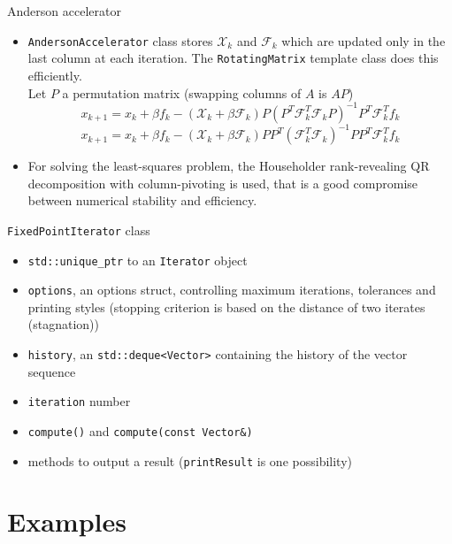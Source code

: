\documentclass{beamer}
\begin{document}
				\begin{frame}{Anderson accelerator}
				\begin{itemize}
				\item \texttt{AndersonAccelerator} class stores
				$\mathscr{X}_k$ and $\mathscr{F}_k$ which are updated 
				only in the last column at each iteration. The \texttt{RotatingMatrix}
				template class does this efficiently.\\
				Let $P$ a permutation matrix (swapping columns of $A$ is $AP$)
				\begin{equation*}
					x_{k+1}=x_{k} + \beta f_k -(\mathscr{X}_k + \beta \mathscr{F}_k)P(P^T \mathscr{F}_k^T \mathscr{F}_k P)^{-1}P^T \mathscr{F}_k^T f_k
				\end{equation*}
				\begin{equation*}
					x_{k+1}=x_{k} + \beta f_k -(\mathscr{X}_k + \beta \mathscr{F}_k)P P^T (\mathscr{F}_k^T \mathscr{F}_k)^{-1} P P^T \mathscr{F}_k^T f_k
				\end{equation*}
				\item For solving the least-squares problem, the Householder rank-revealing
				QR decomposition with column-pivoting is used, that is a good compromise
				between numerical stability and efficiency.
				\end{itemize}
				\end{frame}
				
				
				
				\begin{frame}[fragile]{\texttt{FixedPointIterator} class}
						\begin{itemize}
						\item \verb|std::unique_ptr| to an \verb|Iterator| object
						\item \verb|options|, an options struct, controlling maximum iterations, tolerances and printing styles
								(stopping criterion is based on the distance of two iterates (stagnation))
						\item \verb|history|, an \verb|std::deque<Vector>| containing the history of the vector sequence
						\item \verb|iteration| number
						\item  \verb|compute()| and \verb|compute(const Vector&)|
						\item  methods to output a result (\verb|printResult| is one possibility)
						\end{itemize}	
				\end{frame}


				\section{Examples}
					
\end{document}
